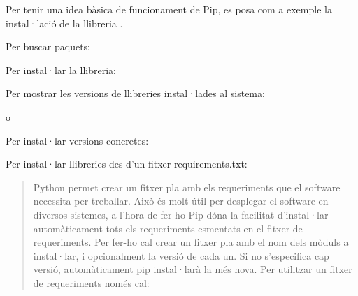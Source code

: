\documentclass[letterpaper,11pt,catalan]{sphinxmanual}
\begin{document}
Per tenir una idea bàsica de funcionament de Pip, es posa com a exemple la instal·lació
de la llibreria .

Per buscar paquets:

\begin{sphinxVerbatim}[commandchars=\\\{\}]
  
\end{sphinxVerbatim}

Per instal·lar la llibreria:

\begin{sphinxVerbatim}[commandchars=\\\{\}]
  
\end{sphinxVerbatim}

Per mostrar les versions de llibreries instal·lades al sistema:

\begin{sphinxVerbatim}[commandchars=\\\{\}]
 
\end{sphinxVerbatim}

o

\begin{sphinxVerbatim}[commandchars=\\\{\}]
 
\end{sphinxVerbatim}

Per instal·lar versions concretes:

\begin{sphinxVerbatim}[commandchars=\\\{\}]
  

  

  
\end{sphinxVerbatim}

Per instal·lar llibreries des d'un fitxer requirements.txt:
\begin{quote}

Python permet crear un fitxer pla amb els requeriments que
el software necessita per treballar. Això és molt útil per
desplegar el software en diversos sistemes, a l'hora de fer-ho
Pip dóna la facilitat d'instal·lar automàticament tots els
requeriments esmentats en el fitxer de requeriments. Per fer-ho
cal crear un fitxer pla amb el nom dels mòduls a instal·lar, i
opcionalment la versió de cada un. Si no s'especifica cap versió,
automàticament pip instal·larà la més nova. Per utilitzar un fitxer
de requeriments només cal:

\begin{sphinxVerbatim}[commandchars=\\\{\}]
   
\end{sphinxVerbatim}
\end{quote}
\end{document}
